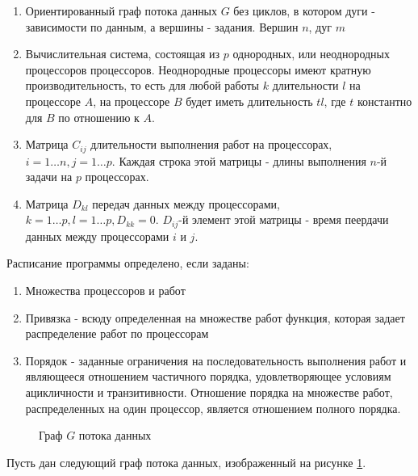 \begin{enumerate}
    \item Ориентированный граф потока данных $G$ без циклов, в котором дуги - зависимости по данным, а вершины - задания. Вершин $n$, дуг $m$
    \item Вычислительная система, состоящая из $p$ однородных, или неоднородных процессоров процессоров. Неоднородные процессоры имеют кратную производительность, то есть для любой работы $k$ длительности $l$ на процессоре $A$, на процессоре $B$ будет иметь длительность $tl$, где $t$ константно для $B$ по отношению к $A$.
    \item Матрица $C_{ij}$ длительности выполнения работ на процессорах, $i=1 \dots n, j=1 \dots p$. Каждая строка этой матрицы - длины выполнения $n$-й задачи на $p$ процессорах. 
    \item Матрица $D_{kl}$ передач данных между процессорами, $k=1 \dots p, l = 1 \dots p, D_{kk} = 0$. $D_{ij}$-й элемент этой матрицы - время пеердачи данных между процессорами $i$ и $j$.
\end{enumerate}

Расписание программы определено, если заданы:
\begin{enumerate}
    \item Множества процессоров и работ
    \item Привязка - всюду определенная на множестве работ функция, которая задает распределение работ по процессорам
    \item Порядок - заданные ограничения на последовательность выполнения работ и являющееся отношением частичного порядка, удовлетворяющее условиям ацикличности и транзитивности. Отношение порядка на множестве работ, распределенных на один процессор, является отношением полного порядка.
\end{enumerate}

\begin{figure}[!htbp]
    \caption{Граф $G$ потока данных}
    \label{fig:DFG}
\end{figure}
Пусть дан следующий граф потока данных, изображенный на рисунке \ref{fig:DFG}.

